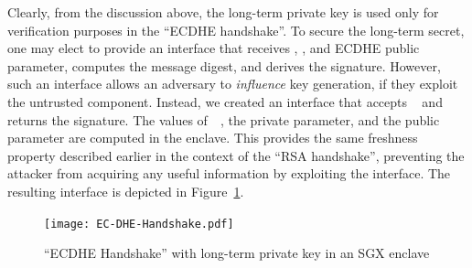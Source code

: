 \documentclass[../../main.tex]{subfiles}
\begin{document}
Clearly, from the discussion above, the long-term private key is used
only for verification purposes in the ``ECDHE handshake''. To secure
the long-term secret, one may elect to provide an interface that
receives \crandom, \srandom, and ECDHE public parameter, computes the
message digest, and derives the signature. However, such an interface
allows an adversary to \textit{influence} key generation, if they
exploit the untrusted component. Instead, we created an interface that
accepts \crandom~ and returns the signature. The values of~\srandom~,
the private parameter, and the public parameter are computed in the
enclave. This provides the same freshness property described earlier
in the context of the ``RSA handshake'', preventing the attacker from
acquiring any useful information by exploiting the interface. The
resulting interface is depicted in Figure~\ref{fig:ecdhe-handshake}.

\begin{figure}[H]
  \centering
  \texttt{[image: EC-DHE-Handshake.pdf]}
  \caption{``ECDHE Handshake'' with long-term private key in an SGX
    enclave}
  \label{fig:ecdhe-handshake}
\end{figure}
\end{document}
